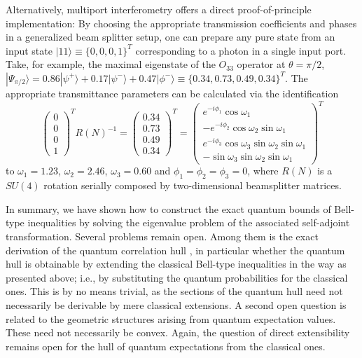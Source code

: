 \documentclass[prl,showpacs,showkeys,amsfonts,amsmath,twocolumn]{revtex4}
\newcommand{\ket}[1]{|#1\rangle}
\begin{document}
Alternatively, multiport interferometry \cite{rzbb,zukowski-97,svozil-2004-analog}
offers a direct proof-of-principle
implementation:
By choosing the appropriate transmission coefficients and phases in a generalized
beam splitter setup, one can prepare any pure state
from an input state $\ket{11} \equiv \{0,0,0,1\}^T$ corresponding to a photon
in a single input port. Take, for example, the maximal eigenstate of
the $O_{33}$ operator at $\theta=\pi/2$, $\ket{\Psi_{\pi/2}}= 0.86
  \ket{\psi^+} + 0.17\ket{\psi^-} + 0.47\ket{\phi^-} \equiv
  \{0.34,0.73,0.49,0.34\}^T$. The appropriate transmittance parameters
  can be calculated via the identification \cite{rzbb}
  \begin{equation}
    \begin{pmatrix}0\\0\\0\\1\end{pmatrix}^T R(N)^{-1} =  \begin{pmatrix}0.34\\0.73\\0.49\\0.34\end{pmatrix}^T =
    \begin{pmatrix}e^{-i\phi_1}\cos\omega_1 \\-e^{-i\phi_2}\cos\omega_2\sin\omega_1\\e^{-i\phi_3}\cos\omega_3\sin\omega_2\sin\omega_1\\-\sin\omega_3\sin\omega_2\sin\omega_1\end{pmatrix}^T
  \end{equation}
to $\omega_1 = 1.23$, $\omega_2=2.46$, $\omega_3=0.60$ and $\phi_1=\phi_2=\phi_3=0$,
where $R(N)$ is a
$SU(4)$ rotation serially composed by two-dimensional beamsplitter
matrices.


In summary, we have shown how to construct the exact quantum bounds of
Bell-type inequalities
by solving the eigenvalue problem of the associated self-adjoint
transformation.
Several problems remain open.
Among them is
the exact derivation of the quantum correlation hull \cite{pit:range-2001,filipp-svo-04-qpoly},
in particular whether the quantum hull is obtainable by extending the
classical Bell-type
inequalities in the way as presented above;
i.e., by substituting the quantum probabilities for the classical ones.
This is by no means trivial,
as the sections of the quantum hull need not necessarily be derivable by mere classical extensions.
A second open question is related to the geometric structures arising from quantum expectation values.
These need not necessarily be convex.
Again, the question of direct extensibility remains open for the hull of
quantum expectations from the classical ones.
\end{document}
